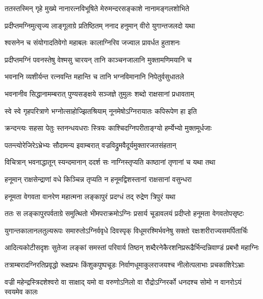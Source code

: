 \twolineshloka
{ततस्तस्मिन् गृहे मुख्ये नानारत्नविभूषिते}
{मेरुमन्दरसङ्काशे नानामङ्गलशोभिते} %

\twolineshloka
{प्रदीप्तमग्निमुत्सृज्य लाङ्गूलाग्रे प्रतिष्ठितम्}
{ननाद हनुमान् वीरो युगान्तजलदो यथा} %

\twolineshloka
{श्वसनेन च संयोगादतिवेगो महाबलः}
{कालाग्निरिव जज्वाल प्रावर्धत हुताशनः} %

\twolineshloka
{प्रदीप्तमग्निं पवनस्तेषु वेश्मसु चारयन्}
{तानि काञ्चनजालानि मुक्तामणिमयानि च} %

\twolineshloka
{भवनानि व्यशीर्यन्त रत्नवन्ति महान्ति च}
{तानि भग्नविमानानि निपेतुर्वसुधातले} %

\twolineshloka
{भवनानीव सिद्धानामम्बरात् पुण्यसङ्क्षये}
{सञ्जज्ञे तुमुलः शब्दो राक्षसानां प्रधावताम्} %

\twolineshloka
{स्वे स्वे गृहपरित्राणे भग्नोत्साहोज्झितश्रियाम्}
{नूनमेषोऽग्निरायातः कपिरूपेण हा इति} %

\twolineshloka
{क्रन्दन्त्यः सहसा पेतुः स्तनन्धयधराः स्त्रियः}
{काश्चिदग्निपरीताङ्ग्यो हर्म्येभ्यो मुक्तमूर्धजाः} %

\twolineshloka
{पतन्त्योरेजिरेऽभ्रेभ्यः सौदामन्य इवाम्बरात्}
{वज्रविद्रुमवैदूर्यमुक्तारजतसंहतान्} %

\twolineshloka
{विचित्रान् भवनाद्धातून् स्यन्दमानान् ददर्श सः}
{नाग्निस्तृप्यति काष्ठानां तृणानां च यथा तथा} %

\twolineshloka
{हनूमान् राक्षसेन्द्राणां वधे किञ्चिन्न तृप्यति}
{न हनूमद्विशस्तानां राक्षसानां वसुन्धरा} %

\twolineshloka
{हनूमता वेगवता वानरेण महात्मना}
{लङ्कापुरं प्रदग्धं तद् रुद्रेण त्रिपुरं यथा} %

\twolineshloka
{ततः स लङ्कापुरपर्वताग्रे समुत्थितो भीमपराक्रमोऽग्निः}
{प्रसार्य चूडावलयं प्रदीप्तो हनूमता वेगवतोपसृष्टः} %

\twolineshloka
{युगान्तकालानलतुल्यरूपः समारुतोऽग्निर्ववृधे दिवस्पृक्}
{विधूमरश्मिर्भवनेषु सक्तो रक्षःशरीराज्यसमर्पितार्चिः} %

\twolineshloka
{आदित्यकोटीसदृशः सुतेजा लङ्कां समस्तां परिवार्य तिष्ठन्}
{शब्दैरनेकैरशनिप्ररूढैर्भिन्दन्निवाण्डं प्रबभौ महाग्निः} %

\twolineshloka
{तत्राम्बरादग्निरतिप्रवृद्धो रूक्षप्रभः किंशुकपुष्पचूडः}
{निर्वाणधूमाकुलराजयश्च नीलोत्पलाभाः प्रचकाशिरेऽभ्राः} %

\twolineshloka
{वज्री महेन्द्रस्त्रिदशेश्वरो वा साक्षाद् यमो वा वरुणोऽनिलो वा}
{रौद्रोऽग्निरर्को धनदश्च सोमो न वानरोऽयं स्वयमेव कालः} %

